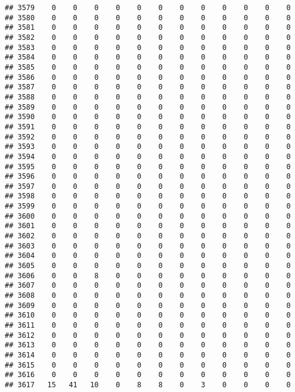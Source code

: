 \documentclass[]{article}
\begin{document}
\begin{verbatim}
## 3579    0    0    0    0    0    0    0    0    0    0    0    0
## 3580    0    0    0    0    0    0    0    0    0    0    0    0
## 3581    0    0    0    0    0    0    0    0    0    0    0    0
## 3582    0    0    0    0    0    0    0    0    0    0    0    0
## 3583    0    0    0    0    0    0    0    0    0    0    0    0
## 3584    0    0    0    0    0    0    0    0    0    0    0    0
## 3585    0    0    0    0    0    0    0    0    0    0    0    0
## 3586    0    0    0    0    0    0    0    0    0    0    0    0
## 3587    0    0    0    0    0    0    0    0    0    0    0    0
## 3588    0    0    0    0    0    0    0    0    0    0    0    0
## 3589    0    0    0    0    0    0    0    0    0    0    0    0
## 3590    0    0    0    0    0    0    0    0    0    0    0    0
## 3591    0    0    0    0    0    0    0    0    0    0    0    0
## 3592    0    0    0    0    0    0    0    0    0    0    0    0
## 3593    0    0    0    0    0    0    0    0    0    0    0    0
## 3594    0    0    0    0    0    0    0    0    0    0    0    0
## 3595    0    0    0    0    0    0    0    0    0    0    0    0
## 3596    0    0    0    0    0    0    0    0    0    0    0    0
## 3597    0    0    0    0    0    0    0    0    0    0    0    0
## 3598    0    0    0    0    0    0    0    0    0    0    0    0
## 3599    0    0    0    0    0    0    0    0    0    0    0    0
## 3600    0    0    0    0    0    0    0    0    0    0    0    0
## 3601    0    0    0    0    0    0    0    0    0    0    0    0
## 3602    0    0    0    0    0    0    0    0    0    0    0    0
## 3603    0    0    0    0    0    0    0    0    0    0    0    0
## 3604    0    0    0    0    0    0    0    0    0    0    0    0
## 3605    0    0    0    0    0    0    0    0    0    0    0    0
## 3606    0    0    8    0    0    0    0    0    0    0    0    0
## 3607    0    0    0    0    0    0    0    0    0    0    0    0
## 3608    0    0    0    0    0    0    0    0    0    0    0    0
## 3609    0    0    0    0    0    0    0    0    0    0    0    0
## 3610    0    0    0    0    0    0    0    0    0    0    0    0
## 3611    0    0    0    0    0    0    0    0    0    0    0    0
## 3612    0    0    0    0    0    0    0    0    0    0    0    0
## 3613    0    0    0    0    0    0    0    0    0    0    0    0
## 3614    0    0    0    0    0    0    0    0    0    0    0    0
## 3615    0    0    0    0    0    0    0    0    0    0    0    0
## 3616    0    0    0    0    0    0    0    0    0    0    0    0
## 3617   15   41   10    0    8    8    0    3    0    0    0    0

\end{verbatim}
\end{document}
